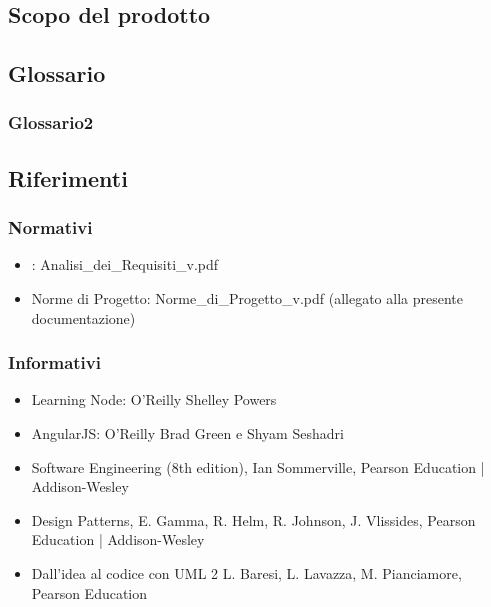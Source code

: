 \subsection{Scopo del prodotto}
\label{1.2}
\Prodotto{}

\subsection{Glossario}
\subsubsection{Glossario2}
\label{1.3}
\Glossario{}

\subsection{Riferimenti}
\label{1.4}

\subsubsection{Normativi}
\label{1.4.1}
\begin{itemize}
\item {}: Analisi\_{}dei\_{}Requisiti\_{}v\versioneNormeDiProgetto{}.pdf
\item Norme di Progetto: Norme\_{}di\_{}Progetto\_{}v\versioneNormeDiProgetto{}.pdf  (allegato alla presente documentazione)\\
\end{itemize}

\subsubsection{Informativi}
\label{1.4.2}
\begin{itemize}
\item Learning Node: O'Reilly Shelley Powers
\item AngularJS: O'Reilly Brad Green e Shyam Seshadri
\item Software Engineering (8th edition), Ian Sommerville, Pearson Education | Addison-Wesley
\item Design Patterns, E. Gamma, R. Helm, R. Johnson, J. Vlissides, Pearson Education | Addison-Wesley
\item Dall'idea al codice con UML 2       L. Baresi, L. Lavazza, M. Pianciamore, Pearson Education
\end{itemize}

